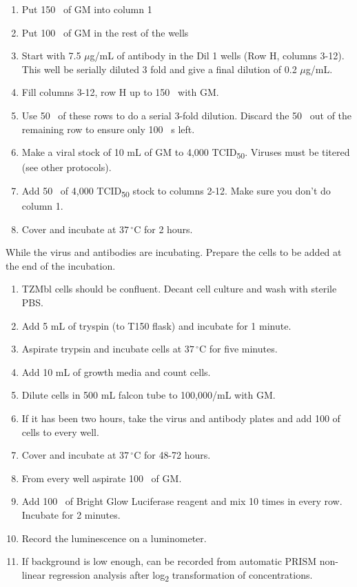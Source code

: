 \begin{enumerate}
  \item Put 150 \microliter~of GM into column 1
  \item Put 100 \microliter~of GM in the rest of the wells
  \item Start with 7.5 $\mu$g/mL of antibody in the Dil 1 wells (Row H, columns 3-12). This well be serially diluted 3 fold and give a final dilution of 0.2 $\mu$g/mL.
  \item Fill columns 3-12, row H up to 150 \microliter~with GM.
  \item Use 50 \microliter~of these rows to do a serial 3-fold dilution. Discard the 50 \microliter~out of the remaining row to ensure only 100 \microliter ~s left.
  \item Make a viral stock of 10 mL of GM to 4,000 TCID\textsubscript{50}. Viruses must be titered (see other protocols).
  \item Add 50 \microliter~of 4,000 TCID\textsubscript{50} stock to columns 2-12. Make sure you don't do column 1.
  \item Cover and incubate at $37\,^{\circ}\mathrm{C}$ for 2 hours.
\end{enumerate}

While the virus and antibodies are incubating. Prepare the cells to be added at the end of the incubation.

\begin{enumerate}
  \item TZMbl cells should be confluent. Decant cell culture and wash with sterile PBS.
  \item Add 5 mL of tryspin (to T150 flask) and incubate for 1 minute.
  \item Aspirate trypsin and incubate cells at $37\,^{\circ}\mathrm{C}$ for five minutes.
  \item Add 10 mL of growth media and count cells.
  \item Dilute cells in 500 mL falcon tube to 100,000/mL with GM.
  \item If it has been two hours, take the virus and antibody plates and add 100 \microliter of cells to every well.
  \item Cover and incubate at $37\,^{\circ}\mathrm{C}$ for 48-72 hours.
  \item From every well aspirate 100 \microliter~of GM.
  \item Add 100 \microliter~of Bright Glow Luciferase reagent and mix 10 times in every row. Incubate for 2 minutes.
  \item Record the luminescence on a luminometer.
  \item If background is low enough, \ic can be recorded from automatic PRISM non-linear regression analysis after log\textsubscript{2} transformation of concentrations.
\end{enumerate}



\clearpage